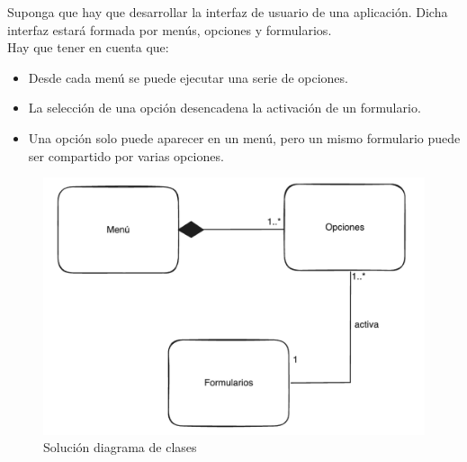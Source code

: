  Suponga que hay que desarrollar la interfaz de usuario de una aplicación. Dicha interfaz estará formada por menús, opciones y formularios.\\ Hay que tener en cuenta que:

\begin{itemize}
  \item Desde cada menú se puede ejecutar una serie de opciones.
  \item La selección de una opción desencadena la activación de un formulario.
  \item Una opción solo puede aparecer en un menú, pero un mismo formulario puede ser compartido por varias opciones.
\end{itemize}

\begin{figure}[h]
  \begin{center}
    \includegraphics[width=\textwidth]{assets/Seminario3_1_1.png}
  \end{center}  
  \caption{Solución diagrama de clases }
\end{figure}

